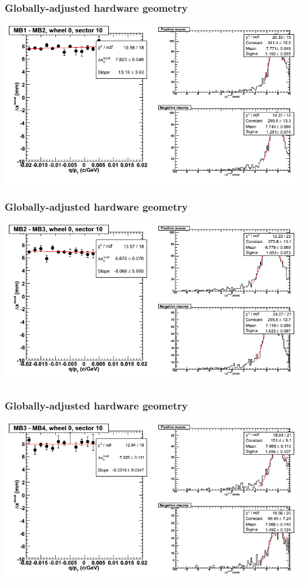 \documentclass[compress]{beamer}
\begin{document}
\begin{frame}
\frametitle{Globally-adjusted hardware geometry}
\includegraphics[width=\linewidth]{NOV4_segdiffs_HW/dt13_resid_C_10_12.png}
\end{frame}

\begin{frame}
\frametitle{Globally-adjusted hardware geometry}
\includegraphics[width=\linewidth]{NOV4_segdiffs_HW/dt13_resid_C_10_23.png}
\end{frame}

\begin{frame}
\frametitle{Globally-adjusted hardware geometry}
\includegraphics[width=\linewidth]{NOV4_segdiffs_HW/dt13_resid_C_10_34.png}
\end{frame}
\end{document}

